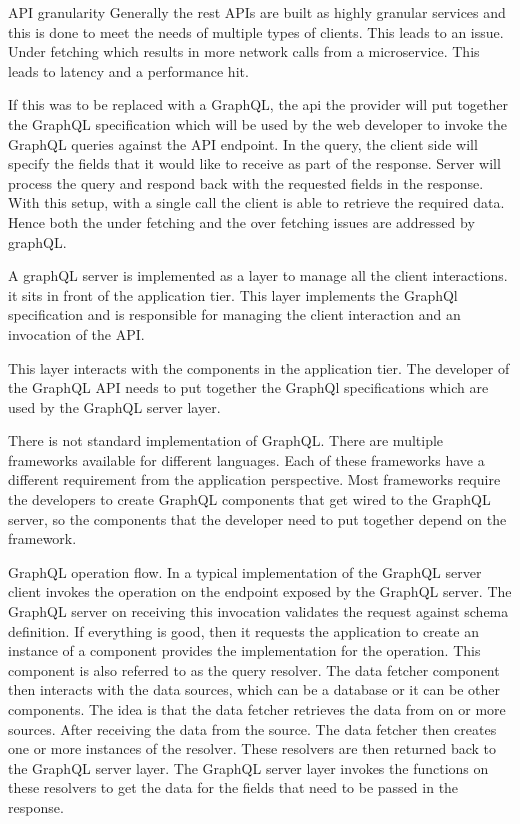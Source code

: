 \documentclass[a4paper, 11pt]{book}
\begin{document}
    API granularity
    Generally the rest APIs are built as highly granular services and this is done to meet the needs of multiple types of clients.
    This leads to an issue.
    Under fetching which results in more network calls from a microservice. This leads to latency and a performance hit.

    If this was to be replaced with a GraphQL, the api the provider will put together the GraphQL specification which will be used by the web developer to invoke the GraphQL queries against the API endpoint.
    In the query, the client side will specify the fields that it would like to receive as part of the response.
    Server will process the query and respond back with the requested fields in the response.
    With this setup, with a single call the client is able to retrieve the required data.
    Hence both the under fetching and the over fetching issues are addressed by graphQL.

    A graphQL server is implemented as a layer to manage all the client interactions.
    it sits in front of the application tier.
    This layer implements the GraphQl specification and is responsible for managing the client interaction and an invocation of the API.

    This layer interacts with the components in the application tier.
    The developer of the GraphQL API needs to put together the GraphQl specifications which are used by the GraphQL server layer.

    There is not standard implementation of GraphQL.
    There are multiple frameworks available for different languages.
    Each of these frameworks have a different requirement from the application perspective.
    Most frameworks require the developers to create GraphQL components that get wired to the GraphQL server, so the components that the developer need to put together depend on the framework.

    GraphQL operation flow.
    In a typical implementation of the GraphQL server client invokes the operation on the endpoint exposed by the GraphQL server.
    The GraphQL server on receiving this invocation validates the request against schema definition.
    If everything is good, then it requests the application to create an instance of a component provides the implementation for the operation.
    This component is also referred to as the query resolver.
    The data fetcher component then interacts with the data sources, which can be a database or it can be other components.
    The idea is that the data fetcher retrieves the data from on or more sources.
    After receiving the data from the source.
    The data fetcher then creates one or more instances of the resolver.
    These resolvers are then returned back to the GraphQL server layer.
    The GraphQL server layer invokes the functions on these resolvers to get the data for the fields that need to be passed in the response.
\end{document}
